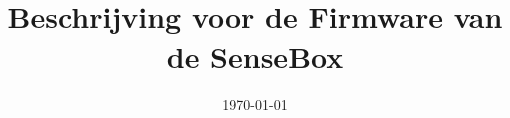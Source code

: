 \documentclass{article}
\title{\LARGE{\titletext}\\\normalsize{Beschrijving voor de Firmware van de SenseBox}}
\author{\authortext}
\date{\today}
\newcommand{\contents} {
  {
    \hypersetup{hidelinks}
    \tableofcontents
  }
  \clearpage
}
\begin{document}
    \maketitle
    \vfill
    \newpage

    \contents

    

    \begin{flushleft}
    
    
    
    
    \end{flushleft}
    
    \newpage
\end{document}
